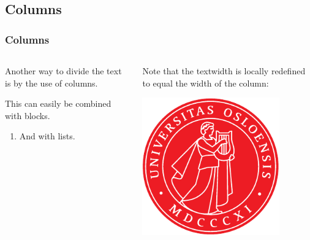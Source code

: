 \documentclass[UKenglish, unknownkeysallowed]{beamer}
\begin{document}
\subsection{Columns}


\begin{frame}
    \frametitle{Columns}

    \begin{columns}[onlytextwidth]
        \begin{column}{0.49\textwidth}
            Another way to divide the text is by the use of \alert{columns}.

            \begin{example}
                This can easily be combined with \alert{blocks}.
            \end{example}

            \begin{enumerate}
                \item
                And with \alert{lists}.
            \end{enumerate}
        \end{column}

        \begin{column}{0.49\textwidth}
            Note that the textwidth is locally redefined to equal the width of the column:
            \begin{center}
                \includegraphics[width = 0.8\textwidth]{apollon}
            \end{center}
        \end{column}
    \end{columns}
\end{frame}
\end{document}
